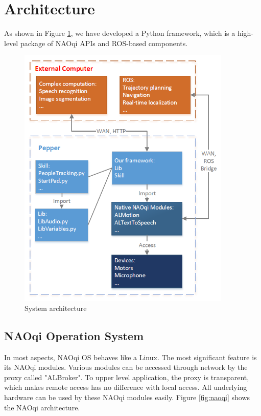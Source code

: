 \section{Architecture}
\label{sec:architecture}

As shown in Figure \ref{fig:archi}, we have developed a Python framework, which is a high-level package of NAOqi APIs and ROS-based components. 
\begin{figure}[!h]
    \centering
    \includegraphics[width=4in]{figs/architecture.png}
    \caption{System architecture}
    \label{fig:archi}
\end{figure}

\subsection{NAOqi Operation System}
\label{subsec:naoqi}
In most aspects, NAOqi OS behaves like a Linux.
The most significant feature is its NAOqi modules.
Various modules can be accessed through network by the proxy called "ALBroker".
To upper level application, the proxy is transparent, which makes remote access has no difference with local access.
All underlying hardware can be used by these NAOqi modules easily.
Figure \ref{fig:naoqi} shows the NAOqi architecture.

